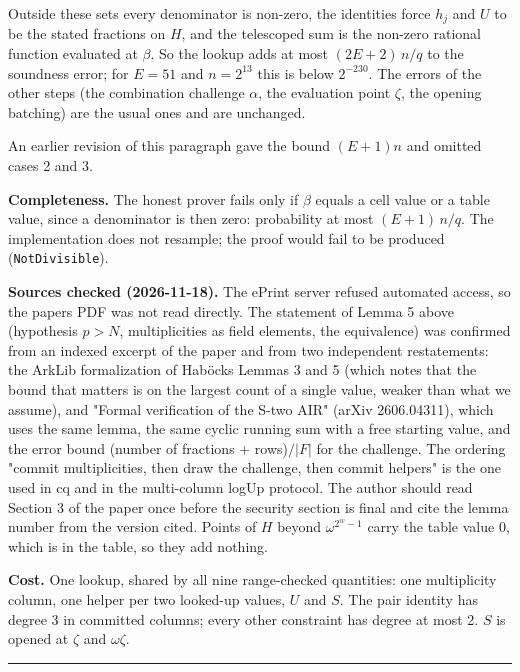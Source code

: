 Outside these sets every denominator is non-zero, the identities force \(h_j\) and \(U\) to be the stated fractions on \(H\), and the telescoped sum is the non-zero rational function evaluated at \(\beta\). So the lookup adds at most \((2E+2)\,n/q\) to the soundness error; for \(E = 51\) and \(n = 2^{13}\) this is below \(2^{-230}\). The errors of the other steps (the combination challenge \(\alpha\), the evaluation point \(\zeta\), the opening batching) are the usual ones and are unchanged.

An earlier revision of this paragraph gave the bound \((E+1)n\) and omitted cases 2 and 3.

\textbf{Completeness.} The honest prover fails only if \(\beta\) equals a cell value or a table value, since a denominator is then zero: probability at most \((E+1)\,n/q\). The implementation does not resample; the proof would fail to be produced (\texttt{NotDivisible}).

\textbf{Sources checked (2026-11-18).} The ePrint server refused automated access, so the paper\textquotesingle s PDF was not read directly. The statement of Lemma 5 above (hypothesis \(p > N\), multiplicities as field elements, the equivalence) was confirmed from an indexed excerpt of the paper and from two independent restatements: the ArkLib formalization of Haböck\textquotesingle s Lemmas 3 and 5 (which notes that the bound that matters is on the largest count of a single value, weaker than what we assume), and "Formal verification of the S-two AIR" (arXiv 2606.04311), which uses the same lemma, the same cyclic running sum with a free starting value, and the error bound (number of fractions + rows)\(/|F|\) for the challenge. The ordering "commit multiplicities, then draw the challenge, then commit helpers" is the one used in cq and in the multi-column logUp protocol. The author should read Section 3 of the paper once before the security section is final and cite the lemma number from the version cited.
Points of \(H\) beyond \(\omega^{2^w-1}\) carry the table value 0, which is in the table, so they add nothing.

\textbf{Cost.} One lookup, shared by all nine range-checked quantities: one multiplicity column, one helper per two looked-up values, \(U\) and \(S\). The pair identity has degree 3 in committed columns; every other constraint has degree at most 2. \(S\) is opened at \(\zeta\) and \(\omega\zeta\).

\begin{center}\rule{0.5\linewidth}{0.5pt}\end{center}

